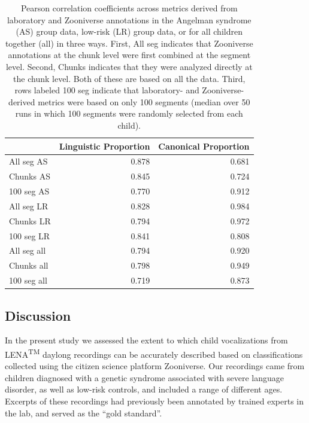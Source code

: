 \documentclass[english,,man]{apa6}
\begin{document}
\begin{table}

\caption{\label{tab:tab-cors}Pearson correlation coefficients across metrics derived from laboratory and Zooniverse annotations in the Angelman syndrome (AS) group data, low-risk (LR) group data, or for all children together (all) in three ways. First, All seg indicates that Zooniverse annotations at the chunk level were first combined at the segment level. Second, Chunks indicates that they were analyzed directly at the chunk level. Both of these are based on all the data. Third, rows labeled 100 seg indicate that laboratory- and Zooniverse-derived metrics were based on only 100 segments (median over 50 runs in which 100 segments were randomly selected from each child).}
\centering
\begin{tabular}[t]{l|r|r}
\hline
  & Linguistic Proportion & Canonical Proportion\\
\hline
All seg AS & 0.878 & 0.681\\
\hline
Chunks AS & 0.845 & 0.724\\
\hline
100 seg AS & 0.770 & 0.912\\
\hline
All seg LR & 0.828 & 0.984\\
\hline
Chunks LR & 0.794 & 0.972\\
\hline
100 seg LR & 0.841 & 0.808\\
\hline
All seg all & 0.794 & 0.920\\
\hline
Chunks all & 0.798 & 0.949\\
\hline
100 seg all & 0.719 & 0.873\\
\hline
\end{tabular}
\end{table}

\hypertarget{discussion}{%
\subsection{Discussion}\label{discussion}}

In the present study we assessed the extent to which child vocalizations from LENA\textsuperscript{TM} daylong recordings can be accurately described based on classifications collected using the citizen science platform Zooniverse. Our recordings came from children diagnosed with a genetic syndrome associated with severe language disorder, as well as low-risk controls, and included a range of different ages. Excerpts of these recordings had previously been annotated by trained experts in the lab, and served as the \enquote{gold standard}.
\end{document}
